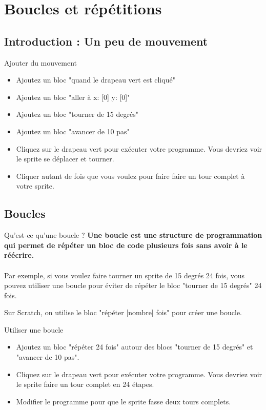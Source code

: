 

\section{Boucles et répétitions}
\subsection{Introduction : Un peu de mouvement}
\begin{UPSTIManipulation}{Ajouter du mouvement}
\begin{itemize}
\item Ajoutez un bloc "quand le drapeau vert est cliqué"
\item Ajoutez un bloc "aller à x: [0] y: [0]"
\item Ajoutez un bloc "tourner de 15 degrés"
\item Ajoutez un bloc "avancer de 10 pas"
\item Cliquez sur le drapeau vert pour exécuter votre programme. Vous devriez voir le sprite se déplacer et tourner.
\item Cliquer autant de fois que vous voulez pour faire faire un tour complet à votre sprite.
\end{itemize}
\end{UPSTIManipulation}



\pagebreak

\subsection{Boucles}
\begin{UPSTIinfor}{Qu'est-ce qu'une boucle ?}
    \vspace{1em}
\textbf{Une boucle est une structure de programmation qui permet de répéter un bloc de code plusieurs fois sans avoir à le réécrire. }\\\\
Par exemple, si vous voulez faire tourner un sprite de 15 degrés 24 fois, vous pouvez utiliser une boucle pour éviter de répéter le bloc "tourner de 15 degrés" 24 fois.
\end{UPSTIinfor}

Sur Scratch, on utilise le bloc "répéter [nombre] fois" pour créer une boucle.

\begin{UPSTIManipulation}{Utiliser une boucle}
\begin{itemize}
\item Ajoutez un bloc "répéter 24 fois" autour des blocs "tourner de 15 degrés" et "avancer de 10 pas".
\item Cliquez sur le drapeau vert pour exécuter votre programme. Vous devriez voir le sprite faire un tour complet en 24 étapes.
\item Modifier le programme pour que le sprite fasse deux tours complets.
\end{itemize}
\end{UPSTIManipulation}

